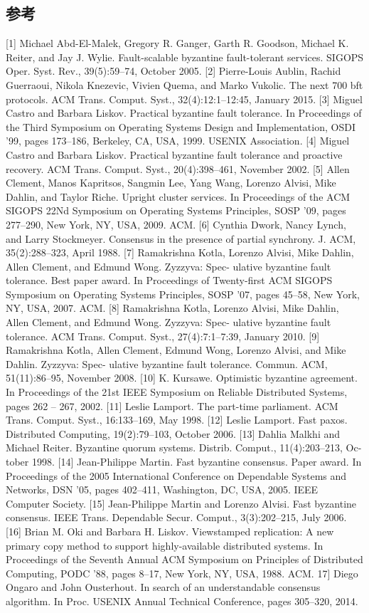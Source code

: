 \documentclass[UTF8]{ctexart}
\begin{document}
\subsection*{参考}
[1] Michael Abd-El-Malek, Gregory R. Ganger, Garth R. Goodson, Michael K. Reiter, and Jay J. Wylie. Fault-scalable byzantine fault-tolerant services. SIGOPS Oper. Syst. Rev., 39(5):59–74, October 2005.
[2] Pierre-Louis Aublin, Rachid Guerraoui, Nikola Knezevic, Vivien Quema, and Marko Vukolic. The next 700 bft protocols. ACM Trans. Comput. Syst., 32(4):12:1–12:45, January 2015.
[3] Miguel Castro and Barbara Liskov. Practical byzantine fault tolerance. In Proceedings of the Third Symposium on Operating Systems Design and Implementation, OSDI ’99, pages 173–186, Berkeley, CA, USA, 1999. USENIX Association.
[4] Miguel Castro and Barbara Liskov. Practical byzantine fault tolerance and proactive recovery. ACM Trans. Comput. Syst., 20(4):398–461, November 2002.
[5] Allen Clement, Manos Kapritsos, Sangmin Lee, Yang Wang, Lorenzo Alvisi, Mike Dahlin, and Taylor Riche. Upright cluster services. In Proceedings of the ACM SIGOPS 22Nd Symposium on Operating Systems Principles, SOSP ’09, pages 277–290, New York, NY, USA, 2009. ACM.
[6] Cynthia Dwork, Nancy Lynch, and Larry Stockmeyer. Consensus in the presence of partial synchrony. J. ACM, 35(2):288–323, April 1988.
[7] Ramakrishna Kotla, Lorenzo Alvisi, Mike Dahlin, Allen Clement, and Edmund Wong. Zyzzyva: Spec- ulative byzantine fault tolerance. Best paper award. In Proceedings of Twenty-first ACM SIGOPS Symposium on Operating Systems Principles, SOSP ’07, pages 45–58, New York, NY, USA, 2007. ACM.
[8] Ramakrishna Kotla, Lorenzo Alvisi, Mike Dahlin, Allen Clement, and Edmund Wong. Zyzzyva: Spec- ulative byzantine fault tolerance. ACM Trans. Comput. Syst., 27(4):7:1–7:39, January 2010.
[9] Ramakrishna Kotla, Allen Clement, Edmund Wong, Lorenzo Alvisi, and Mike Dahlin. Zyzzyva: Spec- ulative byzantine fault tolerance. Commun. ACM, 51(11):86–95, November 2008.
[10] K. Kursawe. Optimistic byzantine agreement. In Proceedings of the 21st IEEE Symposium on Reliable Distributed Systems, pages 262 – 267, 2002.
[11] Leslie Lamport. The part-time parliament. ACM Trans. Comput. Syst., 16:133–169, May 1998.
[12] Leslie Lamport. Fast paxos. Distributed Computing, 19(2):79–103, October 2006.
[13] Dahlia Malkhi and Michael Reiter. Byzantine quorum systems. Distrib. Comput., 11(4):203–213, Oc- tober 1998.
[14] Jean-Philippe Martin. Fast byzantine consensus. Paper award. In Proceedings of the 2005 International Conference on Dependable Systems and Networks, DSN ’05, pages 402–411, Washington, DC, USA, 2005. IEEE Computer Society.
[15] Jean-Philippe Martin and Lorenzo Alvisi. Fast byzantine consensus. IEEE Trans. Dependable Secur. Comput., 3(3):202–215, July 2006.
[16] Brian M. Oki and Barbara H. Liskov. Viewstamped replication: A new primary copy method to support highly-available distributed systems. In Proceedings of the Seventh Annual ACM Symposium on Principles of Distributed Computing, PODC ’88, pages 8–17, New York, NY, USA, 1988. ACM.
17] Diego Ongaro and John Ousterhout. In search of an understandable consensus algorithm. In Proc. USENIX Annual Technical Conference, pages 305–320, 2014.
\end{document}
